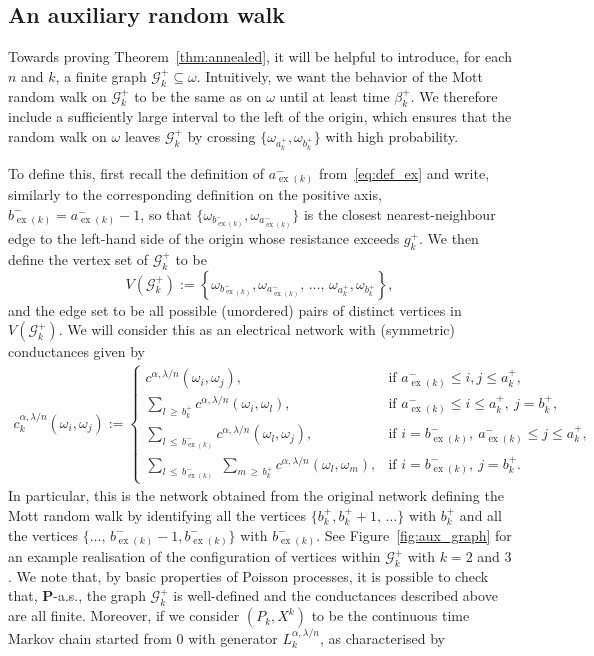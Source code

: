 \documentclass[AHL,Unicode,longabstracts,published]{cedram}
\newcommand{\clG}{\mathcal{G}}
\newcommand{\bfP}{\mathbf{P}}
\newcommand\ex{\operatorname{ex}}
\newcommand{\aat}[1]{a_{\ex(#1)}^-}
\newcommand{\bt}[1]{b_{\ex(#1)}^-}
\begin{document}
\subsection{An auxiliary random walk}\label{sec31}

Towards proving Theorem~\ref{thm:annealed}, it will be helpful to introduce, for each $n$ and $k$, a finite graph $\clG_k^+\subseteq\omega$. Intuitively, we want the behavior of the Mott random walk on $\clG_k^+$ to be the same as on $\omega$ until at least time $\beta_k^+$. We therefore include a sufficiently large interval to the left of the origin, which ensures that the random walk on $\omega$ leaves $\clG_k^+$ by crossing $\{\omega_{a_k^+},\omega_{b_k^+}\}$ with high probability.

To define this, first recall the definition of $\aat{k}$ from~\eqref{eq:def_ex} and write, similarly to the corresponding definition on the positive axis, $\bt{k}=\aat{k}-1$, so that $\{\omega_{\bt{k}},\omega_{\aat{k}}\}$ is the closest nearest-neighbour edge to the left-hand side of the origin whose resistance exceeds $g_k^+$. We then define the vertex set of $\clG_k^+$ to be
\[
V\left(\clG_k^+\right):=\left\{\omega_{\bt{k}},\omega_{\aat{k}},\,\dots,\,\omega_{a_k^+},\omega_{b_k^+}\right\},
\]
and the edge set to be all possible (unordered) pairs of distinct vertices in $V(\clG_k^+)$. We will consider this as an electrical network with (symmetric) conductances given by
\begin{align*}
c^{\alpha,\lambda/n}_k(\omega_i,\omega_j):=\left\{
\begin{array}{ll}
c^{\alpha,\lambda/n}\left(\omega_i,\omega_j\right), & \text{if }\aat{k}\leq i,j\leq a_k^+,\\
\sum_{l\,\geq\,b_k^+}c^{\alpha,\lambda/n}\left(\omega_i,\omega_l\right), & \text{if }\aat{k}\leq i\leq a_k^+,\:j=b_k^+,\\
\sum_{l\,\leq\,\bt{k}}c^{\alpha,\lambda/n}\left(\omega_l,\omega_j\right), & \text{if }i=\bt{k},\:\aat{k}\leq j\leq a_k^+,\\
\sum_{l\,\leq \,\bt{k}}\;\sum_{m\,\geq\,b_k^+}c^{\alpha,\lambda/n}(\omega_l,\omega_m), & \text{if }i=\bt{k},\:j=b_k^+.
\end{array}\right.
\end{align*}
In particular, this is the network obtained from the original network defining the Mott random walk by identifying all the vertices $\{b_k^+,b_k^++1,\,\dots\}$ with $b_k^+$ and all the vertices $\{\dots,\,\bt{k}-1,\bt{k}\}$ with $\bt{k}$. See Figure~\ref{fig:aux_graph} for an example realisation of the configuration of vertices within $\clG_k^+$ with $k=2$ and $3$. We note that, by basic properties of Poisson processes, it is possible to check that, $\bfP$-a.s., the graph $\clG_k^+$ is well-defined and the conductances described above are all finite. Moreover, if we consider $(P_k,X^k)$ to be the continuous time Markov chain started from 0 with generator $L_k^{\alpha,\lambda/n}$, as characterised by
\end{document}
